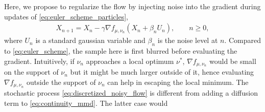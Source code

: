 Here, we propose to regularize the flow by injecting noise into the gradient during updates of \cref{eq:euler_scheme_particles}, %
\begin{align}\label{eq:discretized_noisy_flow}
	X_{n+1} = X_{n} -\gamma \nabla f_{\mu,\nu_n}(X_n+ \beta_n U_n), \qquad n\geq 0,
\end{align}
where $U_n$ is a standard gaussian variable and $\beta_n$ is the noise level at $n$. Compared to \cref{eq:euler_scheme}, the sample here  is  first blurred before evaluating the gradient.
Intuitively, if $\nu_n$ approaches a local optimum $\nu^{*}$, $ \nabla f_{\mu,\nu_n}$ would be small on the support of $\nu_n$ but it might be much larger outside of it, hence evaluating $\nabla f_{\mu,\nu_n}$ outside the support of $\nu_n$ can help in escaping the local minimum. The stochastic process \cref{eq:discretized_noisy_flow} is different from adding a diffusion term to \cref{eq:continuity_mmd}. The latter case would %
